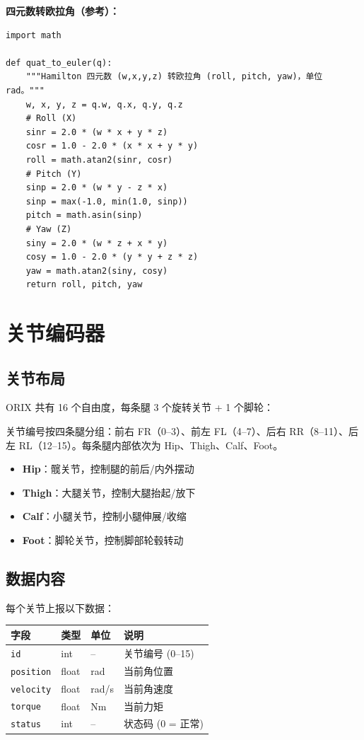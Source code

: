 \documentclass[a4paper,11pt,openany]{book}
\begin{document}
\noindent\textbf{四元数转欧拉角（参考）：}

\begin{lstlisting}[style=python]
import math

def quat_to_euler(q):
    """Hamilton 四元数 (w,x,y,z) 转欧拉角 (roll, pitch, yaw)，单位 rad。"""
    w, x, y, z = q.w, q.x, q.y, q.z
    # Roll (X)
    sinr = 2.0 * (w * x + y * z)
    cosr = 1.0 - 2.0 * (x * x + y * y)
    roll = math.atan2(sinr, cosr)
    # Pitch (Y)
    sinp = 2.0 * (w * y - z * x)
    sinp = max(-1.0, min(1.0, sinp))
    pitch = math.asin(sinp)
    # Yaw (Z)
    siny = 2.0 * (w * z + x * y)
    cosy = 1.0 - 2.0 * (y * y + z * z)
    yaw = math.atan2(siny, cosy)
    return roll, pitch, yaw
\end{lstlisting}

\section{关节编码器}

\subsection{关节布局}

ORIX 共有 16 个自由度，每条腿 3 个旋转关节 + 1 个脚轮：

关节编号按四条腿分组：前右 FR（0--3）、前左 FL（4--7）、后右 RR（8--11）、后左 RL（12--15）。每条腿内部依次为 Hip、Thigh、Calf、Foot。

\begin{itemize}[nosep]
  \item \textbf{Hip}：髋关节，控制腿的前后/内外摆动
  \item \textbf{Thigh}：大腿关节，控制大腿抬起/放下
  \item \textbf{Calf}：小腿关节，控制小腿伸展/收缩
  \item \textbf{Foot}：脚轮关节，控制脚部轮毂转动
\end{itemize}

\subsection{数据内容}

每个关节上报以下数据：

\begin{longtable}{llll}
\toprule
字段 & 类型 & 单位 & 说明 \\
\midrule
\endhead
\texttt{id} & int & -- & 关节编号 (0--15) \\
\texttt{position} & float & rad & 当前角位置 \\
\texttt{velocity} & float & rad/s & 当前角速度 \\
\texttt{torque} & float & Nm & 当前力矩 \\
\texttt{status} & int & -- & 状态码 (0 = 正常) \\
\bottomrule
\end{longtable}
\end{document}
